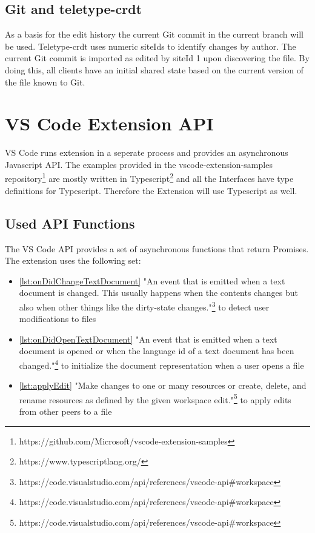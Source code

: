 \subsection{Git and teletype-crdt}
As a basis for the edit history  the current Git commit in the current branch will be used. Teletype-crdt uses numeric siteIds to identify changes by author. The current Git commit is imported as edited by siteId 1 upon discovering the file. By doing this, all clients have an initial shared state based on the current version of the file known to Git.

\section{VS Code Extension API}

VS Code runs extension in a seperate process and provides an asynchronous Javascript API.
The examples provided in the vscode-extension-samples repository\footnote{https://github.com/Microsoft/vscode-extension-samples} are mostly written in Typescript\footnote{https://www.typescriptlang.org/} and all the Interfaces have type definitions for Typescript.
Therefore the Extension will use Typescript as well.

\subsection{Used API Functions}

The VS Code API provides a set of asynchronous functions that return Promises.
The extension uses the following set:

\begin{itemize}
    \item \ref{lst:onDidChangeTextDocument} "An event that is emitted when a text document is changed. This usually happens when the contents changes but also when other things like the dirty-state changes."\footnote{https://code.visualstudio.com/api/references/vscode-api\#workspace} to detect user modifications to files
    \item \ref{lst:onDidOpenTextDocument} "An event that is emitted when a text document is opened or when the language id of a text document has been changed."\footnote{https://code.visualstudio.com/api/references/vscode-api\#workspace} to initialize the document representation when a user opens a file
    \item \ref{lst:applyEdit} "Make changes to one or many resources or create, delete, and rename resources as defined by the given workspace edit."\footnote{https://code.visualstudio.com/api/references/vscode-api\#workspace} to apply edits from other peers to a file
\end{itemize}

